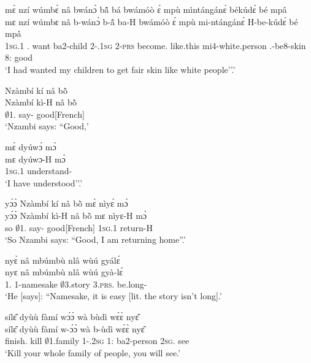\begin{exe}[(N234)]
 \largerpage
\exN\label{n140}
  \glll mɛ̀ nzí wúmbɛ̀ nâ bwánɔ̀ bã̂ bá bwámóò ɛ́ mpù mìntángánɛ́ békúdɛ́ bé mpâ \\
    mɛ nzí wúmbɛ nâ b-wánɔ̀ b-ã̂ ba-H bwámóò ɛ́ mpù mi-ntángánɛ́ H-be-kúdɛ́ bé mpâ \\
    1\textsc{sg}.{\PST}1 {\PROG}.{\PST}  want {\COMP} ba2-child 2-{\POSS}.1\textsc{sg} 2-\textsc{prs} become.{\SBJV}  {\LOC} like.this mi4-white.person {\OBJ}.{\LINK}-be8-skin 8:{\ATT}  good \\
    \trans `I had wanted my children to get fair skin like white people''.'
 
\exN\label{n141} 
  \glll Nzàmbí kí nâ bõ̀ \\
        Nzàmbí kì-H nâ bõ̀ \\
       $\emptyset$1.{\PN} say-{\R} {\COMP} good[French]  \\
    \trans `Nzambi says: ``Good,'
 
\exN\label{n142}
  \glll mɛ̀ dyúwɔ́ mɔ̀ \\
       mɛ dyúwɔ-H mɔ̀ \\
        1\textsc{sg}.{\PST}1 understand-{\R} {\COMPL} \\
    \trans `I have understood''.'
 
\exN\label{n143}
  \glll yɔ́ɔ̀ Nzàmbí kí nâ bõ̀ mɛ̀ nìyɛ́ mɔ̀\\
        yɔ́ɔ̀ Nzàmbí kì-H nâ bõ̀ mɛ nìyɛ-H mɔ̀\\
        so $\emptyset$1.{\PN} say-{\R} {\COMP} good[French] 1\textsc{sg}.{\PST}1 return-H {\COMPL}\\
    \trans `So Nzambi says: ``Good, I am returning home''.'
 
\exN\label{n144} 
  \glll nyɛ̀ nâ mbúmbù nlâ wùú gyálɛ́ \\
         nyɛ nâ mbúmbù nlâ wùú gyà-lɛ́ \\
        1.{\SBJ}  {\COMP} {\N}1-namesake $\emptyset$3.story 3.\textsc{prs}.{\NEG} be.long-{\NEG} \\
    \trans `He [says]: ``Namesake, it is easy [lit. the story isn't long].'
 
\exN\label{n145}
  \glll sílɛ̂ dyùù fàmí wɔ́ɔ̀ wà bùdì wɛ̀ɛ̀ nyɛ̂ \\
       sílɛ̂ dyùù fàmí w-ɔ́ɔ̀ wà b-ùdì wɛ̀ɛ̀ nyɛ̂ \\
       finish.{\IMP}  kill $\emptyset$1.family 1-{\POSS}.2\textsc{sg} 1:{\ATT}  ba2-person 2\textsc{sg}.{\FUT} see  \\
    \trans `Kill your whole family of people, you will see.'
 

\end{exe}
